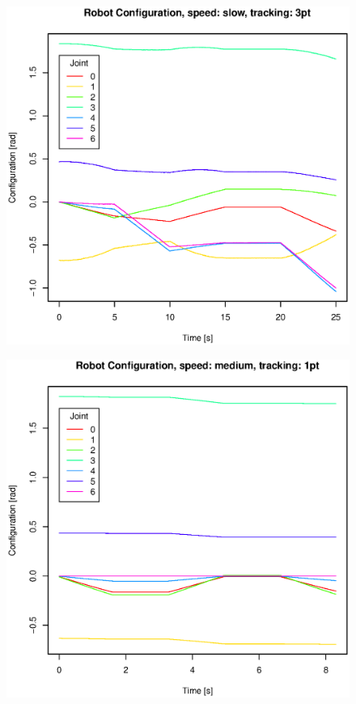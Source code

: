 \begin{figure}[H]
\centering
\includegraphics[width= \linewidth]{graphics/robotics/robotConfiguration_slow_3pt}
\caption{}
\label{fig:}
\end{figure}

\begin{figure}[H]
\centering
\includegraphics[width= \linewidth]{graphics/robotics/robotConfiguration_medium_1pt}
\caption{}
\label{fig:}
\end{figure}

